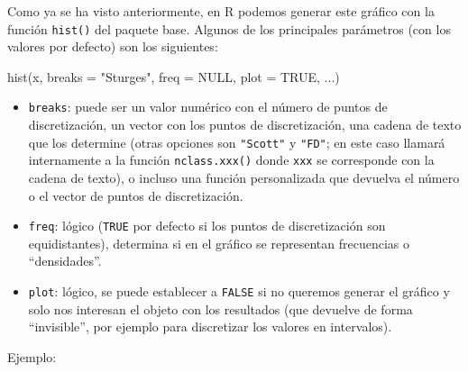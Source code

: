 \documentclass[
]{book}
\newenvironment{Shaded}{\begin{snugshade}}{\end{snugshade}}
\newcommand{\AttributeTok}[1]{\textcolor[rgb]{0.77,0.63,0.00}{#1}}
\newcommand{\ConstantTok}[1]{\textcolor[rgb]{0.00,0.00,0.00}{#1}}
\newcommand{\FunctionTok}[1]{\textcolor[rgb]{0.00,0.00,0.00}{#1}}
\newcommand{\NormalTok}[1]{#1}
\newcommand{\StringTok}[1]{\textcolor[rgb]{0.31,0.60,0.02}{#1}}
\theoremstyle{break}
\theoremstyle{nonumberplain}
\begin{document}
Como ya se ha visto anteriormente, en R podemos generar este gráfico con la función \texttt{hist()} del paquete base.
Algunos de los principales parámetros (con los valores por defecto) son los siguientes:

\begin{Shaded}
\begin{Highlighting}[]
\FunctionTok{hist}\NormalTok{(x, }\AttributeTok{breaks =} \StringTok{"Sturges"}\NormalTok{, }\AttributeTok{freq =} \ConstantTok{NULL}\NormalTok{, }\AttributeTok{plot =} \ConstantTok{TRUE}\NormalTok{, ...)}
\end{Highlighting}
\end{Shaded}

\begin{itemize}
\item
  \texttt{breaks}: puede ser un valor numérico con el número de puntos de discretización, un vector con los puntos de discretización, una cadena de texto que los determine (otras opciones son \texttt{"Scott"} y \texttt{"FD"}; en este caso llamará internamente a la función \texttt{nclass.xxx()} donde \texttt{xxx} se corresponde con la cadena de texto), o incluso una función personalizada que devuelva el número o el vector de puntos de discretización.
\item
  \texttt{freq}: lógico (\texttt{TRUE} por defecto si los puntos de discretización son equidistantes), determina si en el gráfico se representan frecuencias o ``densidades''.
\item
  \texttt{plot}: lógico, se puede establecer a \texttt{FALSE} si no queremos generar el gráfico y solo nos interesan el objeto con los resultados (que devuelve de forma ``invisible'', por ejemplo para discretizar los valores en intervalos).
\end{itemize}

Ejemplo:
\end{document}
